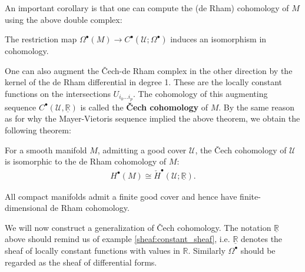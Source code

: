     An important corollary is that one can compute the (de Rham) cohomology of $M$ using the above double complex:
    \begin{theorem}
        The restriction map $\Omega^\bullet(M)\rightarrow C^\bullet(\mathcal{U}; \Omega^\bullet)$ induces an isomorphism in cohomology.
    \end{theorem}
    One can also augment the \v{C}ech-de Rham complex in the other direction by the kernel of the de Rham differential in degree 1. These are the locally constant functions on the intersections $U_{i_0\ldots i_p}$. The cohomology of this augmenting sequence $C^\bullet(\mathcal{U}, \underline{\mathbb{R}})$ is called the \textbf{\v{C}ech cohomology} of $M$. By the same reason as for why the Mayer-Vietoris sequence implied the above theorem, we obtain the following theorem:
    \begin{theorem}[\v{C}ech $=$ de Rham]
        For a smooth manifold $M$, admitting a good cover $\mathcal{U}$, the \v{C}ech cohomology of $\mathcal{U}$ is isomorphic to the de Rham cohomology of $M$:
        \begin{gather}
            H^\bullet(M)\cong\check{H}^\bullet(\mathcal{U}; \underline{\mathbb{R}}).
        \end{gather}
    \end{theorem}
    \begin{result}
        All compact manifolds admit a finite good cover and hence have finite-dimensional de Rham cohomology.
    \end{result}

    We will now construct a generalization of \v{C}ech cohomology. The notation $\underline{\mathbb{R}}$ above should remind us of example \ref{sheaf:constant_sheaf}, i.e. $\underline{\mathbb{R}}$ denotes the sheaf of locally constant functions with values in $\mathbb{R}$. Similarly $\Omega^\bullet$ should be regarded as the sheaf of differential forms.

